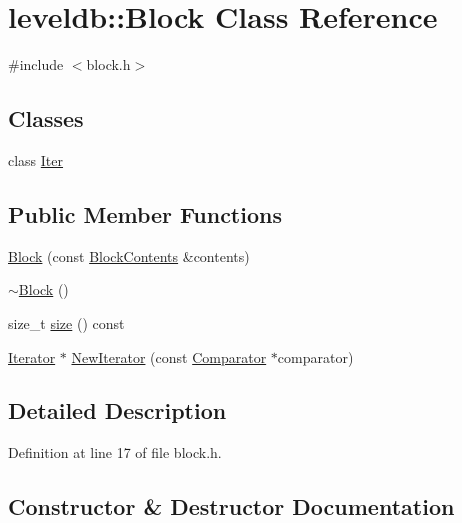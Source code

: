 \hypertarget{classleveldb_1_1_block}{}\section{leveldb\+:\+:Block Class Reference}
\label{classleveldb_1_1_block}


{\ttfamily \#include $<$block.\+h$>$}

\subsection*{Classes}
\begin{DoxyCompactItemize}
\item 
class \hyperlink{classleveldb_1_1_block_1_1_iter}{Iter}
\end{DoxyCompactItemize}
\subsection*{Public Member Functions}
\begin{DoxyCompactItemize}
\item 
\hyperlink{classleveldb_1_1_block_a242f2101a3c906b6f75f5c008e3ecdd9}{Block} (const \hyperlink{structleveldb_1_1_block_contents}{Block\+Contents} \&contents)
\item 
\hyperlink{classleveldb_1_1_block_a949c8f02dd434861cc1c352bd258ea47}{$\sim$\+Block} ()
\item 
size\+\_\+t \hyperlink{classleveldb_1_1_block_aa3834a89827b5363c11fbdca6d0b1c92}{size} () const 
\item 
\hyperlink{classleveldb_1_1_iterator}{Iterator} $\ast$ \hyperlink{classleveldb_1_1_block_a336289029f37d18d31a1a3c178afc7b3}{New\+Iterator} (const \hyperlink{structleveldb_1_1_comparator}{Comparator} $\ast$comparator)
\end{DoxyCompactItemize}


\subsection{Detailed Description}


Definition at line 17 of file block.\+h.



\subsection{Constructor \& Destructor Documentation}
\hypertarget{classleveldb_1_1_block_a242f2101a3c906b6f75f5c008e3ecdd9}{}
